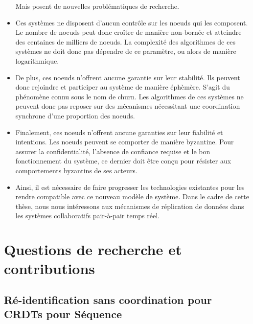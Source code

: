 \documentclass[12pt]{thesul}
\begin{document}
\begin{itemize}
    Mais posent de nouvelles problématiques de recherche.
  \item Ces systèmes ne disposent d'aucun contrôle sur les noeuds qui les composent.
    Le nombre de noeuds peut donc croître de manière non-bornée et atteindre des centaines de milliers de noeuds.
    La complexité des algorithmes de ces systèmes ne doit donc pas dépendre de ce paramètre, ou alors de manière logarithmique.
  \item De plus, ces noeuds n'offrent aucune garantie sur leur stabilité.
    Ils peuvent donc rejoindre et participer au système de manière éphèmère.
    S'agit du phénomène connu sous le nom de churn.
    Les algorithmes de ces systèmes ne peuvent donc pas reposer sur des mécanismes nécessitant une coordination synchrone d'une proportion des noeuds.
  \item Finalement, ces noeuds n'offrent aucune garanties sur leur fiabilité et intentions.
    Les noeuds peuvent se comporter de manière byzantine.
    Pour assurer la confidentialité, l'absence de confiance requise et le bon fonctionnement du système, ce dernier doit être conçu pour résister aux comportements byzantins de ses acteurs.
  \item Ainsi, il est nécessaire de faire progresser les technologies existantes pour les rendre compatible avec ce nouveau modèle de système.
    Dans le cadre de cette thèse, nous nous intéressons aux mécanismes de réplication de données dans les systèmes collaboratifs pair-à-pair temps réel.
\end{itemize}

\section{Questions de recherche et contributions}

\subsection{Ré-identification sans coordination pour \acp{CRDT} pour Séquence}
\end{document}
